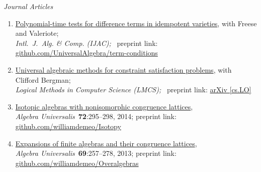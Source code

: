 \newcommand\mmskip{-6mm}

\newcommand\pubitem[6]{\item \href{#5}{#1}, #2\\\textit{#3}~#4 preprint link: \href{#5}{#6}}

    {\it Journal Articles}%
    \begin{enumerate}
\pubitem
{Polynomial-time tests for difference terms in idempotent varieties}
{with Freese and Valeriote;}
{Intl.~J.~Alg. \& Comp. {\small (IJAC)};}
{}
{https://github.com/UniversalAlgebra/term-conditions/tree/master/ijac}
{github.com/UniversalAlgebra/term-conditions}

\pubitem
{Universal algebraic methods for constraint satisfaction problems}
{with Clifford Bergman;}
{Logical Methods in Computer Science {\small (LMCS)};}
{}
{https://arxiv.org/abs/1611.02867}
{arXiv [cs.LO]}

\pubitem 
{Isotopic algebras with nonisomorphic congruence lattices}
{ }  %
{Algebra Universalis}
{\textbf{72}:295--298, 2014;} 
{https://github.com/williamdemeo/Isotopy}
{github.com/williamdemeo/Isotopy}


\pubitem 
{Expansions of finite algebras and their congruence lattices}
{ }
{Algebra Universalis}
{\textbf{69}:257--278, 2013;}
{https://github.com/williamdemeo/Overalgebras}
{github.com/williamdemeo/Overalgebras}

\end{enumerate}


